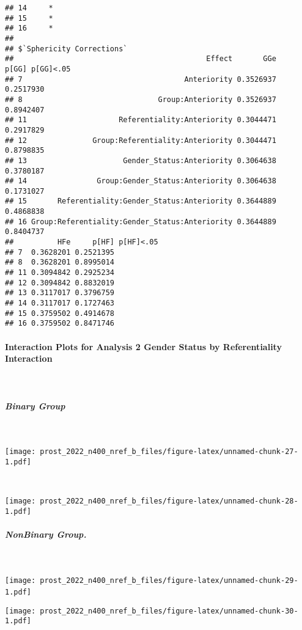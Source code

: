 \documentclass[
]{article}
\begin{document}
\begin{verbatim}
## 14     *
## 15     *
## 16     *
## 
## $`Sphericity Corrections`
##                                            Effect       GGe     p[GG] p[GG]<.05
## 7                                     Anteriority 0.3526937 0.2517930          
## 8                               Group:Anteriority 0.3526937 0.8942407          
## 11                     Referentiality:Anteriority 0.3044471 0.2917829          
## 12               Group:Referentiality:Anteriority 0.3044471 0.8798835          
## 13                      Gender_Status:Anteriority 0.3064638 0.3780187          
## 14                Group:Gender_Status:Anteriority 0.3064638 0.1731027          
## 15       Referentiality:Gender_Status:Anteriority 0.3644889 0.4868838          
## 16 Group:Referentiality:Gender_Status:Anteriority 0.3644889 0.8404737          
##          HFe     p[HF] p[HF]<.05
## 7  0.3628201 0.2521395          
## 8  0.3628201 0.8995014          
## 11 0.3094842 0.2925234          
## 12 0.3094842 0.8832019          
## 13 0.3117017 0.3796759          
## 14 0.3117017 0.1727463          
## 15 0.3759502 0.4914678          
## 16 0.3759502 0.8471746
\end{verbatim}

\hypertarget{interaction-plots-for-analysis-2-gender-status-by-referentiality-interaction}{%
\paragraph{Interaction Plots for Analysis 2 Gender Status by
Referentiality
Interaction}\label{interaction-plots-for-analysis-2-gender-status-by-referentiality-interaction}}

~

\hypertarget{binary-group}{%
\subparagraph{Binary Group}\label{binary-group}}

~

\texttt{[image: prost\_2022\_n400\_nref\_b\_files/figure-latex/unnamed-chunk-27-1.pdf]}

~

\texttt{[image: prost\_2022\_n400\_nref\_b\_files/figure-latex/unnamed-chunk-28-1.pdf]}

\hypertarget{nonbinary-group.-1}{%
\subparagraph{NonBinary Group.}\label{nonbinary-group.-1}}

~

\texttt{[image: prost\_2022\_n400\_nref\_b\_files/figure-latex/unnamed-chunk-29-1.pdf]}
~

\texttt{[image: prost\_2022\_n400\_nref\_b\_files/figure-latex/unnamed-chunk-30-1.pdf]}
\end{document}
